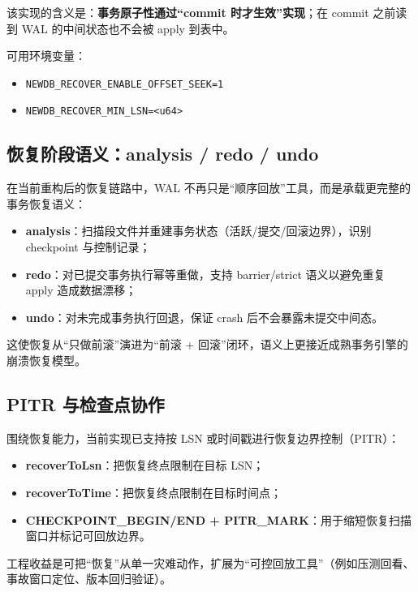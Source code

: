该实现的含义是：\textbf{事务原子性通过“commit 时才生效”实现}；在 commit 之前读到 WAL 的中间状态也不会被 apply 到表中。

可用环境变量：

\begin{itemize}
  \item \texttt{NEWDB\_RECOVER\_ENABLE\_OFFSET\_SEEK=1}
  \item \texttt{NEWDB\_RECOVER\_MIN\_LSN=<u64>}
\end{itemize}

\subsection{恢复阶段语义：analysis / redo / undo}

在当前重构后的恢复链路中，WAL 不再只是“顺序回放”工具，而是承载更完整的事务恢复语义：

\begin{itemize}
  \item \textbf{analysis}：扫描段文件并重建事务状态（活跃/提交/回滚边界），识别 checkpoint 与控制记录；
  \item \textbf{redo}：对已提交事务执行幂等重做，支持 barrier/strict 语义以避免重复 apply 造成数据漂移；
  \item \textbf{undo}：对未完成事务执行回退，保证 crash 后不会暴露未提交中间态。
\end{itemize}

这使恢复从“只做前滚”演进为“前滚 + 回滚”闭环，语义上更接近成熟事务引擎的崩溃恢复模型。

\subsection{PITR 与检查点协作}

围绕恢复能力，当前实现已支持按 LSN 或时间戳进行恢复边界控制（PITR）：

\begin{itemize}
  \item \textbf{recoverToLsn}：把恢复终点限制在目标 LSN；
  \item \textbf{recoverToTime}：把恢复终点限制在目标时间点；
  \item \textbf{CHECKPOINT\_BEGIN/END + PITR\_MARK}：用于缩短恢复扫描窗口并标记可回放边界。
\end{itemize}

工程收益是可把“恢复”从单一灾难动作，扩展为“可控回放工具”（例如压测回看、事故窗口定位、版本回归验证）。


